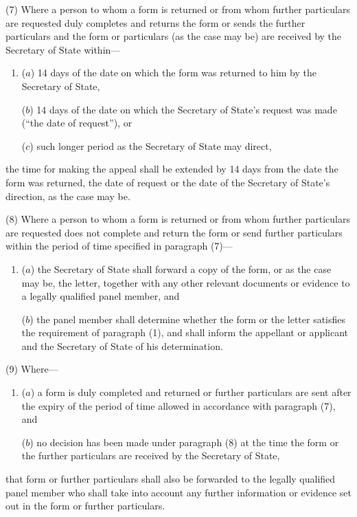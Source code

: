 \documentclass[12pt,a4paper]{article}
\begin{document}
(7) Where a person to whom a form is returned or from whom further particulars are requested duly completes and returns the form or sends the further particulars and the form or particulars (as the case may be) are received by the Secretary of State within—
\begin{enumerate}\item[]
($a$) 14 days of the date on which the form was returned to him by the Secretary of State,

($b$) 14 days of the date on which the Secretary of State’s request was made (“the date of request”), or

($c$) such longer period as the Secretary of State may direct,
\end{enumerate}
the time for making the appeal shall be extended by 14 days from the date the form was returned, the date of request or the date of the Secretary of State’s direction, as the case may be.

(8) Where a person to whom a form is returned or from whom further particulars are requested does not complete and return the form or send further particulars within the period of time specified in paragraph (7)—
\begin{enumerate}\item[]
($a$) the Secretary of State shall forward a copy of the form, or as the case may be, the letter, together with any other relevant documents or evidence to a legally qualified panel member, and

($b$) the panel member shall determine whether the form or the letter satisfies the requirement of paragraph (1), and shall inform the appellant or applicant and the Secretary of State of his determination.
\end{enumerate}

(9) Where—
\begin{enumerate}\item[]
($a$) a form is duly completed and returned or further particulars are sent after the expiry of the period of time allowed in accordance with paragraph (7), and

($b$) no decision has been made under paragraph (8) at the time the form or the further particulars are received by the Secretary of State,
\end{enumerate}
that form or further particulars shall also be forwarded to the legally qualified panel member who shall take into account any further information or evidence set out in the form or further particulars.
\end{document}
